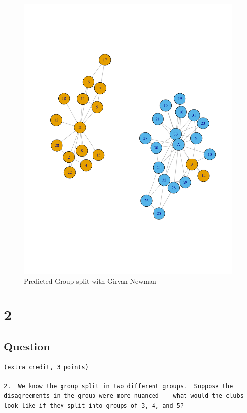 \documentclass[letterpaper,11pt]{article}
\begin{document}
\begin{figure}[h]
\centering
\includegraphics[scale=0.6]{predictedSplit2.pdf}
\caption{Predicted Group split with Girvan-Newman }
\label{fig:q1outcome}
\end{figure}

\clearpage


\section*{2}

\subsection*{Question}

\begin{verbatim}
(extra credit, 3 points)

2.  We know the group split in two different groups.  Suppose the
disagreements in the group were more nuanced -- what would the clubs
look like if they split into groups of 3, 4, and 5?
\end{verbatim}
\end{document}
